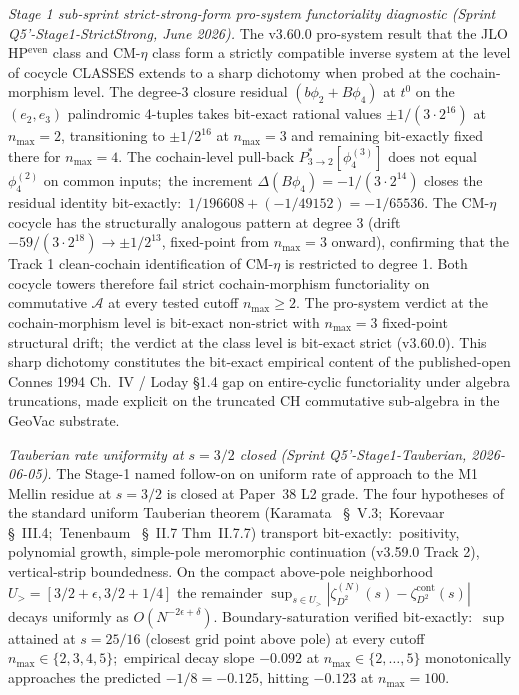 \documentclass[11pt,a4paper]{article}
\theoremstyle{plain}
\theoremstyle{definition}
\begin{document}
\emph{Stage 1 sub-sprint strict-strong-form pro-system functoriality
diagnostic (Sprint Q5'-Stage1-StrictStrong, June 2026).}
The v3.60.0 pro-system result that the JLO HP$^{\mathrm{even}}$ class
and CM-$\eta$ class form a strictly compatible inverse system at the
level of cocycle CLASSES extends to a sharp dichotomy when probed at
the cochain-morphism level.  The degree-3 closure residual
$(b\phi_2 + B\phi_4)$ at $t^0$ on the $(e_2, e_3)$ palindromic 4-tuples
takes bit-exact rational values $\pm 1/(3 \cdot 2^{16})$ at $n_{\max} = 2$,
transitioning to $\pm 1/2^{16}$ at $n_{\max} = 3$ and remaining
bit-exactly fixed there for $n_{\max} = 4$.  The cochain-level pull-back
$P^*_{3 \to 2}[\phi_4^{(3)}]$ does not equal $\phi_4^{(2)}$ on common
inputs;\ the increment $\Delta(B\phi_4) = -1/(3 \cdot 2^{14})$ closes
the residual identity bit-exactly:\ $1/196608 + (-1/49152) = -1/65536$.
The CM-$\eta$ cocycle has the structurally analogous pattern at
degree 3 (drift $-59/(3 \cdot 2^{18}) \to \pm 1/2^{13}$, fixed-point
from $n_{\max} = 3$ onward), confirming that the Track 1 clean-cochain
identification of CM-$\eta$ is restricted to degree 1.  Both cocycle
towers therefore fail strict cochain-morphism functoriality on
commutative $\mathcal{A}$ at every tested cutoff $n_{\max} \ge 2$.
The pro-system verdict at the cochain-morphism level is bit-exact
non-strict with $n_{\max} = 3$ fixed-point structural drift;\ the
verdict at the class level is bit-exact strict (v3.60.0).  This sharp
dichotomy constitutes the bit-exact empirical content of the
published-open Connes 1994 Ch.~IV / Loday \S 1.4 gap on entire-cyclic
functoriality under algebra truncations, made explicit on the
truncated CH commutative sub-algebra in the GeoVac substrate.

\emph{Tauberian rate uniformity at $s = 3/2$ closed (Sprint
Q5'-Stage1-Tauberian, 2026-06-05).}  The Stage-1 named
follow-on on uniform rate of approach to the M1 Mellin residue at
$s = 3/2$ is closed at Paper~38 L2 grade.  The four hypotheses of the
standard uniform Tauberian theorem (Karamata~\cite{karamata1962}
\S~V.3;\ Korevaar~\cite{korevaar2004} \S~III.4;\
Tenenbaum~\cite{tenenbaum2015} \S~II.7 Thm~II.7.7) transport bit-exactly:\
positivity, polynomial growth, simple-pole meromorphic continuation
(v3.59.0 Track 2), vertical-strip boundedness.  On the compact
above-pole neighborhood $U_{>} = [3/2 + \epsilon, 3/2 + 1/4]$ the
remainder $\sup_{s \in U_{>}} |\zeta_{D^2}^{(N)}(s) - \zeta_{D^2}^{\mathrm{cont}}(s)|$
decays uniformly as $O(N^{-2\epsilon + \delta})$.  Boundary-saturation
verified bit-exactly:\ $\sup$ attained at $s = 25/16$ (closest grid
point above pole) at every cutoff $n_{\max} \in \{2, 3, 4, 5\}$;\
empirical decay slope $-0.092$ at $n_{\max} \in \{2,\ldots,5\}$
monotonically approaches the predicted $-1/8 = -0.125$, hitting
$-0.123$ at $n_{\max} = 100$.
\end{document}
